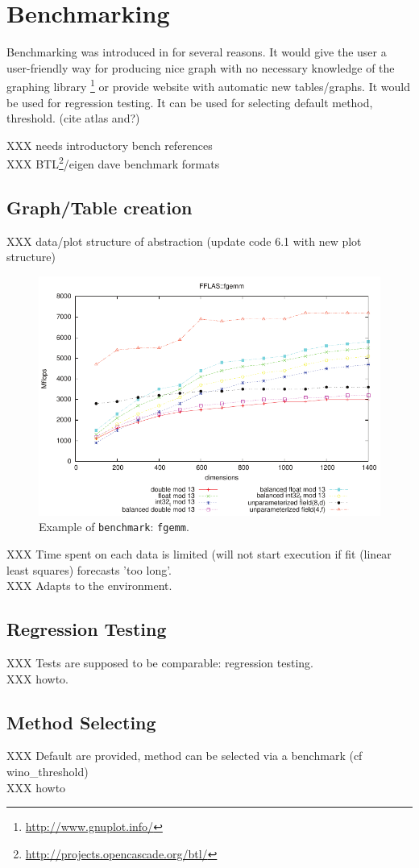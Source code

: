 \section{Benchmarking}\label{sec:bench}
%
Benchmarking was introduced in \linbox for several reasons. It would give the
user a user-friendly way for producing nice graph with no necessary knowledge
of the graphing library \gnuplot%
%
%
\footnote{\url{http://www.gnuplot.info/}}
%
or provide \linbox website with automatic new tables/graphs.
It would be used for regression testing.
It can be used for selecting default method, threshold. (cite atlas and?)
\par
%
XXX needs introductory bench references\\
XXX BTL\footnote{\url{http://projects.opencascade.org/btl/}}/eigen
%
\danger dave benchmark formats
%
\subsection{Graph/Table creation}
%
XXX data/plot structure of abstraction (update code 6.1 with new plot structure)
%
\par
%
\begin{figure}[htbp]
	\centering
	\includegraphics[scale=1]{fgemm_square_13_ok}
	\caption{Example of \texttt{benchmark}: \texttt{fgemm}.\label{fig:bench}}
\end{figure}
%
XXX Time spent on each data is limited (will not start execution if fit (linear least squares) forecasts 'too long'.\\
XXX Adapts to the environment.
%
\subsection{Regression Testing}
%
XXX Tests are supposed to be comparable: regression testing.\\
XXX howto.
%
\subsection{Method Selecting}
%
XXX Default are provided, method can be selected via a benchmark (cf wino\_threshold)\\
XXX howto
